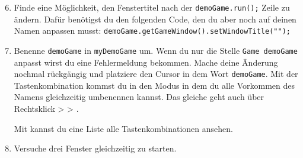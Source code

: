 \begin{enumerate} \setcounter{enumi}{5}
    \item \optional Finde eine Möglichkeit, den Fenstertitel nach der \lstinline{demoGame.run();} Zeile zu ändern.
        Dafür benötigst du den folgenden Code, den du aber noch auf deinen Namen anpassen musst: \lstinline{demoGame.getGameWindow().setWindowTitle("");}
    \item \optional Benenne \lstinline{demoGame} in \lstinline{myDemoGame} um.
        Wenn du nur die Stelle \lstinline{Game demoGame} anpasst wirst du eine Fehlermeldung bekommen.
        Mache deine Änderung nochmal rückgängig und platziere den Cursor in dem Wort \lstinline{demoGame}.
        Mit der Tastenkombination  kommst du in den  Modus in dem du alle Vorkommen des Namens gleichzeitig umbenennen kannst.
        Das gleiche geht auch über Rechtsklick >  > .

        Mit  kannst du eine Liste alle Tastenkombinationen ansehen.
    \item \optional Versuche drei Fenster gleichzeitig zu starten. 
\end{enumerate}
